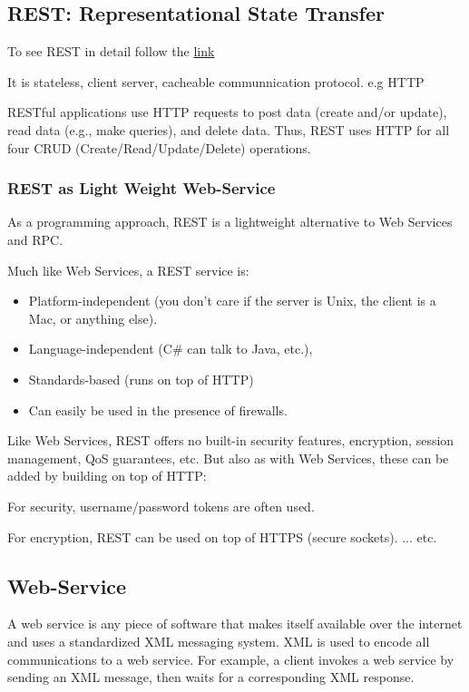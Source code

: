 \documentclass[letterpaper,10pt,english]{sphinxmanual}
\begin{document}
\subsection{REST: Representational State Transfer}
\label{week-10:rest-representational-state-transfer}
To see REST in detail follow the \href{http://rest.elkstein.org/}{link}

It is stateless, client server, cacheable communnication protocol. e.g HTTP

RESTful applications use HTTP requests to post data (create and/or update), read data (e.g., make queries), and delete data. Thus, REST uses HTTP for all four CRUD (Create/Read/Update/Delete) operations.


\subsubsection{REST as Light Weight Web-Service}
\label{week-10:rest-as-light-weight-web-service}
As a programming approach, REST is a lightweight alternative to Web Services and RPC.

Much like Web Services, a REST service is:
\begin{itemize}
\item {} 
Platform-independent (you don't care if the server is Unix, the client is a Mac, or anything else).

\item {} 
Language-independent (C\# can talk to Java, etc.),

\item {} 
Standards-based (runs on top of HTTP)

\item {} 
Can easily be used in the presence of firewalls.

\end{itemize}

Like Web Services, REST offers no built-in security features, encryption, session management, QoS guarantees, etc. But also as with Web Services, these can be added by building on top of HTTP:

For security, username/password tokens are often used.

For encryption, REST can be used on top of HTTPS (secure sockets).
... etc.


\subsection{Web-Service}
\label{week-10:web-service}
A web service is any piece of software that makes itself available over the internet and uses a standardized XML messaging system. XML is used to encode all communications to a web service. For example, a client invokes a web service by sending an XML message, then waits for a corresponding XML response.
\end{document}

